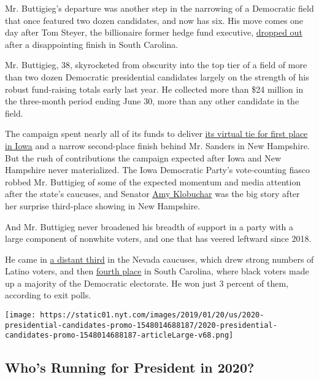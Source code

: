 Mr. Buttigieg's departure was another step in the narrowing of a
Democratic field that once featured two dozen candidates, and now has
six. His move comes one day after Tom Steyer, the billionaire former
hedge fund executive,
\href{https://www.nytimes.com/2020/02/29/us/politics/tom-steyer-drops-out.html}{dropped
out} after a disappointing finish in South Carolina.

Mr. Buttigieg, 38, skyrocketed from obscurity into the top tier of a
field of more than two dozen Democratic presidential candidates largely
on the strength of his robust fund-raising totals early last year. He
collected more than \$24 million in the three-month period ending June
30, more than any other candidate in the field.

The campaign spent nearly all of its funds to deliver
\href{https://www.nytimes.com/interactive/2020/02/04/us/elections/results-iowa-caucus.html}{its
virtual tie for first place in Iowa} and a narrow second-place finish
behind Mr. Sanders in New Hampshire. But the rush of contributions the
campaign expected after Iowa and New Hampshire never materialized. The
Iowa Democratic Party's vote-counting fiasco robbed Mr. Buttigieg of
some of the expected momentum and media attention after the state's
caucuses, and Senator
\href{https://www.nytimes.com/interactive/2020/us/elections/amy-klobuchar.html}{Amy
Klobuchar} was the big story after her surprise third-place showing in
New Hampshire.

And Mr. Buttigieg never broadened his breadth of support in a party with
a large component of nonwhite voters, and one that has veered leftward
since 2018.

He came in
\href{https://www.nytimes.com/interactive/2020/02/22/us/elections/results-nevada-caucus.html}{a
distant third} in the Nevada caucuses, which drew strong numbers of
Latino voters, and then
\href{https://www.nytimes.com/interactive/2020/02/29/us/elections/results-south-carolina-primary-election.html}{fourth
place} in South Carolina, where black voters made up a majority of the
Democratic electorate. He won just 3 percent of them, according to exit
polls.

\href{https://www.nytimes.com/interactive/2019/us/politics/2020-presidential-candidates.html}{}

\texttt{[image: https://static01.nyt.com/images/2019/01/20/us/2020-presidential-candidates-promo-1548014688187/2020-presidential-candidates-promo-1548014688187-articleLarge-v68.png]}

\hypertarget{whos-running-for-president-in-2020}{%
\subsection{Who's Running for President in
2020?}\label{whos-running-for-president-in-2020}}

